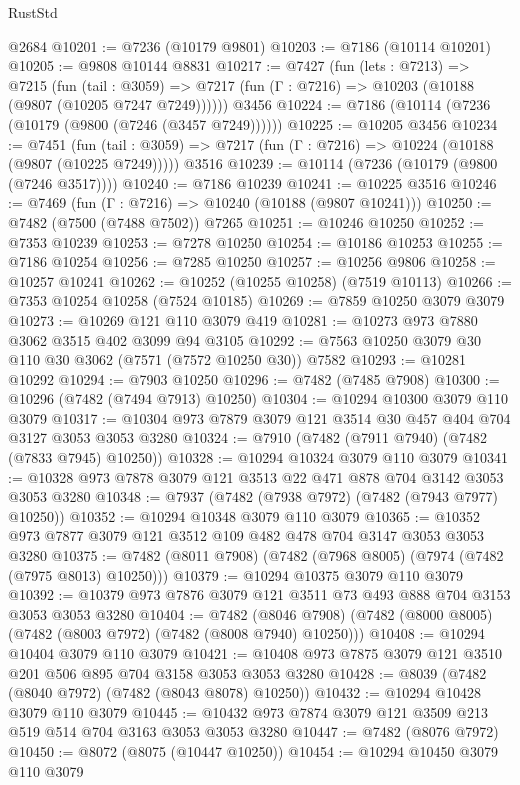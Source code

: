 \begin{lexlean}{RustStd}
\begin{coremodule}
{\begin{coremodule}
{{{{{{{{{{{{{{{{{{{{{{{{{{{{{{{{    @2684
@10201 := @7236 (@10179 @9801)
@10203 := @7186 (@10114 @10201)
@10205 := @9808 @10144 @8831
@10217 := @7427
    (fun (lets : @7213) =>
    @7215
      (fun (tail : @3059) =>
      @7217 (fun (Γ : @7216) => @10203 (@10188 (@9807 (@10205 @7247 @7249))))))
    @3456
@10224 := @7186 (@10114 (@7236 (@10179 (@9800 (@7246 (@3457 @7249))))))
@10225 := @10205 @3456
@10234 := @7451
    (fun (tail : @3059) => @7217 (fun (Γ : @7216) => @10224 (@10188 (@9807 (@10225 @7249)))))
    @3516
@10239 := @10114 (@7236 (@10179 (@9800 (@7246 @3517))))
@10240 := @7186 @10239
@10241 := @10225 @3516
@10246 := @7469 (fun (Γ : @7216) => @10240 (@10188 (@9807 @10241)))
@10250 := @7482 (@7500 (@7488 @7502)) @7265
@10251 := @10246 @10250
@10252 := @7353 @10239
@10253 := @7278 @10250
@10254 := @10186 @10253
@10255 := @7186 @10254
@10256 := @7285 @10250
@10257 := @10256 @9806
@10258 := @10257 @10241
@10262 := @10252 (@10255 @10258) (@7519 @10113)
@10266 := @7353 @10254 @10258 (@7524 @10185)
@10269 := @7859 @10250 @3079 @3079
@10273 := @10269 @121 @110 @3079 @419
@10281 := @10273 @973 @7880 @3062 @3515 @402 @3099 @94 @3105
@10292 := @7563 @10250 @3079 @30 @110 @30 @3062 (@7571 (@7572 @10250 @30)) @7582
@10293 := @10281 @10292
@10294 := @7903 @10250
@10296 := @7482 (@7485 @7908)
@10300 := @10296 (@7482 (@7494 @7913) @10250)
@10304 := @10294 @10300 @3079 @110 @3079
@10317 := @10304 @973 @7879 @3079 @121 @3514 @30 @457 @404 @704 @3127 @3053 @3053 @3280
@10324 := @7910 (@7482 (@7911 @7940) (@7482 (@7833 @7945) @10250))
@10328 := @10294 @10324 @3079 @110 @3079
@10341 := @10328 @973 @7878 @3079 @121 @3513 @22 @471 @878 @704 @3142 @3053 @3053 @3280
@10348 := @7937 (@7482 (@7938 @7972) (@7482 (@7943 @7977) @10250))
@10352 := @10294 @10348 @3079 @110 @3079
@10365 := @10352 @973 @7877 @3079 @121 @3512 @109 @482 @478 @704 @3147 @3053 @3053 @3280
@10375 := @7482 (@8011 @7908) (@7482 (@7968 @8005) (@7974 (@7482 (@7975 @8013) @10250)))
@10379 := @10294 @10375 @3079 @110 @3079
@10392 := @10379 @973 @7876 @3079 @121 @3511 @73 @493 @888 @704 @3153 @3053 @3053 @3280
@10404 := @7482
    (@8046 @7908)
    (@7482 (@8000 @8005) (@7482 (@8003 @7972) (@7482 (@8008 @7940) @10250)))
@10408 := @10294 @10404 @3079 @110 @3079
@10421 := @10408 @973 @7875 @3079 @121 @3510 @201 @506 @895 @704 @3158 @3053 @3053 @3280
@10428 := @8039 (@7482 (@8040 @7972) (@7482 (@8043 @8078) @10250))
@10432 := @10294 @10428 @3079 @110 @3079
@10445 := @10432 @973 @7874 @3079 @121 @3509 @213 @519 @514 @704 @3163 @3053 @3053 @3280
@10447 := @7482 (@8076 @7972)
@10450 := @8072 (@8075 (@10447 @10250))
@10454 := @10294 @10450 @3079 @110 @3079
}}}}}}}}}}}}}}}}}}}}}}}}}}}}}}}}
\end{coremodule}}
\end{coremodule}
\end{lexlean}
